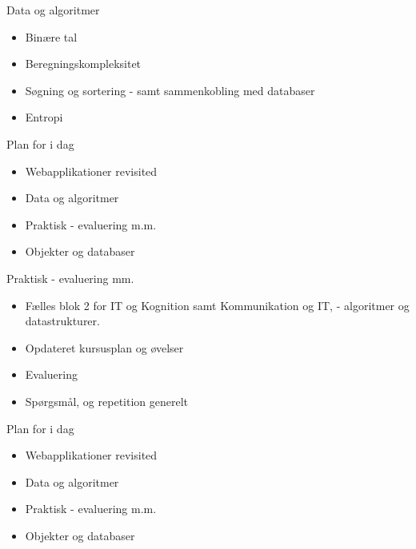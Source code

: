 \documentclass[a4paper,landscape]{slides}
\begin{document}
\begin{slide}
	\begin{center} {\large 
            Data og algoritmer 
	} \end{center}
	\begin{itemize} \addtolength{\itemsep}{-\baselineskip}
            \item Binære tal 
            \item Beregningskompleksitet
            \item Søgning og sortering - samt sammenkobling med databaser 
            \item Entropi
	\end{itemize}
\end{slide}

\begin{slide}
	\begin{center} {\large 
            Plan for i dag
	} \end{center}
	\begin{itemize} \addtolength{\itemsep}{-\baselineskip}
            \item Webapplikationer revisited
            \item Data og algoritmer
            \item Praktisk - evaluering m.m.
            \item Objekter og databaser
	\end{itemize}
\end{slide}

\begin{slide}
	\begin{center} {\large 
            Praktisk - evaluering mm. 
	} \end{center}
	\begin{itemize} \addtolength{\itemsep}{-\baselineskip}
                \item Fælles blok 2 for IT og Kognition samt Kommunikation og IT, - algoritmer og datastrukturer. 
                \item Opdateret kursusplan og øvelser 
                \item Evaluering
                \item Spørgsmål, og repetition generelt 
	\end{itemize}
\end{slide}

\begin{slide}
	\begin{center} {\large 
            Plan for i dag
	} \end{center}
	\begin{itemize} \addtolength{\itemsep}{-\baselineskip}
            \item Webapplikationer revisited
            \item Data og algoritmer
            \item Praktisk - evaluering m.m.
            \item Objekter og databaser
	\end{itemize}
\end{slide}
\end{document}
